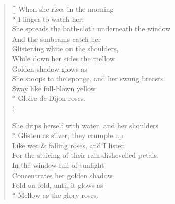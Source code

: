 \documentclass[MAIN]{subfiles}
\begin{document}
\settowidth{\versewidth}{She spreads the bath-cloth underneath the window}
\begin{verse}[\versewidth]
When she rises in the morning\\*
I linger to watch her;\\
She spreads the bath-cloth underneath the window\\
And the sunbeams catch her\\
Glistening white on the shoulders,\\
While down her sides the mellow\\
Golden shadow glows as\\
She stoops to the sponge, and her swung breasts\\
Sway like full-blown yellow\\*
Gloire de Dijon roses.\\!

She drips herself with water, and her shoulders\\*
Glisten as silver, they crumple up\\
Like wet \& falling roses, and I listen\\
For the sluicing of their rain-dishevelled petals.\\
In the window full of sunlight\\
Concentrates her golden shadow\\
Fold on fold, until it glows as\\*
Mellow as the glory roses.
\end{verse}
\end{document}
